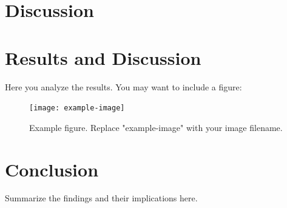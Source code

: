 \documentclass[a4paper,12pt]{article}
\begin{document}
	\section{Discussion}
	\label{dis}
	
	
	
	\section{Results and Discussion}
	Here you analyze the results. You may want to include a figure:
	
	\begin{figure}[h]
		\centering
		\texttt{[image: example-image]} %
		\caption{Example figure. Replace "example-image" with your image filename.}
		\label{fig:example}
	\end{figure}
	
	\section{Conclusion}
	Summarize the findings and their implications here.
	

	
	
\end{document}

